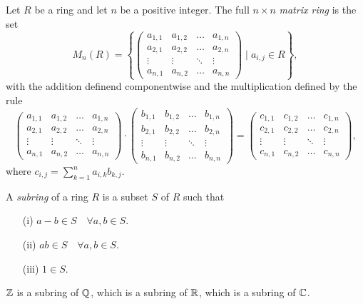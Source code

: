 \begin{example}	
Let $R$ be a ring and let $n$ be a positive integer. The full $n\times n$ {\em matrix ring} is the set
$$M_n(R)=\left\{\left(\begin{array}{cccc}
	a_{1,1}&a_{1,2}&\ldots&a_{1,n}\\
	a_{2,1}&a_{2,2}&\ldots&a_{2,n}\\
	\vdots&\vdots&\ddots&\vdots\\
	a_{n,1}&a_{n,2}&\ldots&a_{n,n}
	\end{array}\right)\mid a_{i,j}\in R\right\},$$
with the addition definend componentwise and the multiplication defined by the rule
$$\left(\begin{array}{cccc}
	a_{1,1}&a_{1,2}&\ldots&a_{1,n}\\
	a_{2,1}&a_{2,2}&\ldots&a_{2,n}\\
	\vdots&\vdots&\ddots&\vdots\\
	a_{n,1}&a_{n,2}&\ldots&a_{n,n}
\end{array}\right)\cdot\left(\begin{array}{cccc}
b_{1,1}&b_{1,2}&\ldots&b_{1,n}\\
b_{2,1}&b_{2,2}&\ldots&b_{2,n}\\
\vdots&\vdots&\ddots&\vdots\\
b_{n,1}&b_{n,2}&\ldots&b_{n,n}
\end{array}\right)=\left(\begin{array}{cccc}
	c_{1,1}&c_{1,2}&\ldots&c_{1,n}\\
	c_{2,1}&c_{2,2}&\ldots&c_{2,n}\\
	\vdots&\vdots&\ddots&\vdots\\
	c_{n,1}&c_{n,2}&\ldots&c_{n,n}
\end{array}\right),$$
where $c_{i,j}=\sum_{k=1}^na_{i,k}b_{k,j}$.
\end{example}

A {\em subring} of a ring $R$ is a subset $S$ of $R$ such that
\begin{itemize}
\item[(i)] $a-b\in S\quad\forall a,b\in S$.
\item[(ii)] $ab\in S\quad\forall a,b\in S$.
\item[(iii)] $1\in S$.
\end{itemize}

\begin{example}
	$\mathbb{Z}$ is a subring of $\mathbb{Q}$, which is a subring of $\mathbb{R}$, which is a subring of $\mathbb{C}$.
	\end{example}

